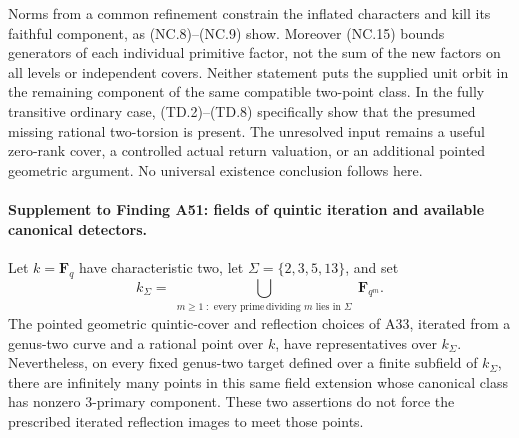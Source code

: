 \documentclass[11pt,a4paper]{article}
\begin{document}
Norms from a common refinement constrain the inflated
characters and kill its faithful component, as (NC.8)--(NC.9)
show. Moreover (NC.15) bounds generators of each individual
primitive factor, not the sum of the new factors on all
levels or independent covers. Neither statement puts the
supplied unit orbit in the remaining component of the same
compatible two-point class. In the fully transitive ordinary
case, (TD.2)--(TD.8) specifically show that the presumed
missing rational two-torsion is present. The unresolved
input remains a useful zero-rank cover, a controlled actual
return valuation, or an additional pointed geometric
argument. No universal existence conclusion follows here.


\paragraph{Supplement to Finding A51: fields of quintic iteration and available canonical detectors.}
Let $k=\mathbf F_q$ have characteristic two, let
$\Sigma=\{2,3,5,13\}$, and set
\[
 k_\Sigma=\bigcup_{\substack{m\ge1\;:\text{ every prime}\,
                              \text{dividing }m\text{ lies in }\Sigma}}
                              \mathbf F_{q^m}.
 \tag{FI.1}
\]
The pointed geometric quintic-cover and reflection choices of A33,
iterated from a genus-two curve and a rational point over $k$, have
representatives over $k_\Sigma$. Nevertheless, on every fixed
genus-two target defined over a finite subfield of $k_\Sigma$,
there are infinitely many points in this same field extension whose
canonical class has nonzero $3$-primary component. These two assertions
do not force the prescribed iterated reflection images to meet those
points.
\end{document}
